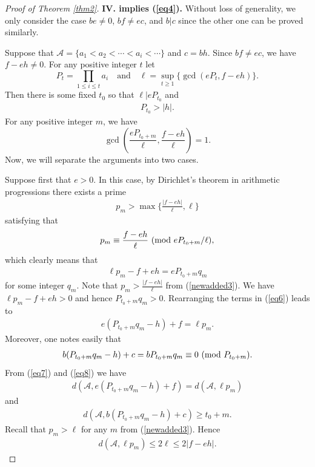 \documentclass[12pt,a4paper,reqno]{amsart}
\numberwithin{equation}{section}
\def\pmod #1{\ ({\rm{mod}}\ #1)}
\theoremstyle{plain}
\theoremstyle{definition}
\begin{document}
\begin{proof}[Proof of Theorem \ref{thm2}]
{\bf IV. implies (\ref{eq4}).} Without loss of generality, we only consider the case $be \neq 0$, $bf\neq ec$, and $b|c$ since the other one can be proved similarly.

Suppose that $\mathcal{A}=\{a_1<a_2<\cdots<a_i<\cdots\}$ and $c=bh$. Since $bf\neq ec$, we have $f-eh\neq 0$. For any positive integer $t$ let
$$
P_t=\prod_{1\le i\le t}a_i \quad \text{and} \quad \ell=\sup_{t\ge 1}\big\{\gcd(eP_t,f-eh)\big\}.
$$
Then there is some fixed $t_0$ so that $\ell|eP_{t_0}$ and
\begin{align}\label{newadded2}
P_{t_0}>|h|. 
\end{align}
For any positive integer $m$, we  have 
$$
\gcd\left(\frac{eP_{t_0+m}}{\ell},\frac{f-eh}{\ell}\right)=1.
$$
Now, we will separate the arguments into two cases. 

Suppose first that $e>0$.  
In this case, by Dirichlet's theorem in arithmetic progressions there exists a prime 
\begin{align}\label{newadded3}
p_m>\max\Big\{\frac{|f-eh|}{\ell},\ell\Big\}
\end{align}
satisfying that
\begin{align}\label{eq5}
p_m\equiv \frac{f-eh}{\ell} \pmod{eP_{t_0+m}/\ell},
\end{align}
which clearly means that
\begin{align}\label{eq6}
\ell p_m-f+eh=eP_{t_0+m}q_m
\end{align}
for some integer $q_m$. Note that $p_m>\frac{|f-eh|}{\ell}$ from (\ref{newadded3}). We have $\ell p_m-f+eh>0$ and hence $P_{t_0+m}q_m>0$.
Rearranging the terms in (\ref{eq6}) leads to
\begin{align}\label{eq7}
e(P_{t_0+m}q_m-h)+f=\ell p_m.
\end{align}
Moreover, one notes easily that
\begin{align}\label{eq8}
b(P_{t_0+m}q_m-h)+c=bP_{t_0+m}q_m\equiv 0\pmod{P_{t_0+m}}.
\end{align}
From (\ref{eq7}) and (\ref{eq8}) we have
\begin{align}\label{eq9}
d(\mathcal{A},e(P_{t_0+m}q_m-h)+f)=d(\mathcal{A},\ell p_m)
\end{align}
and
\begin{align}\label{eq10}
d(\mathcal{A},b(P_{t_0+m}q_m-h)+c)\ge t_0+m.
\end{align}
Recall that $p_m>\ell$ for any $m$ from (\ref{newadded3}). Hence 
\begin{align}\label{eq11}
d(\mathcal{A},\ell p_m)\le 2\ell\le 2|f-eh|.
\end{align}

\end{proof}
\end{document}
